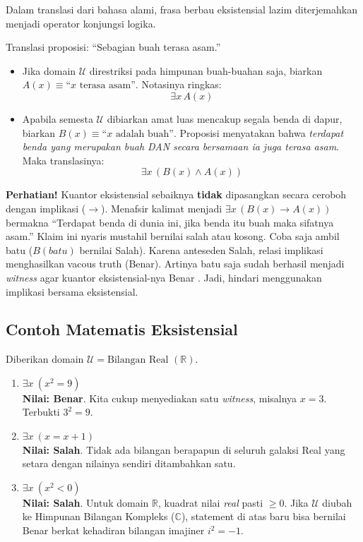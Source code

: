Dalam translasi dari bahasa alami, frasa berbau eksistensial lazim diterjemahkan menjadi operator konjungsi logika.

\begin{contoh}
Translasi proposisi: ``Sebagian buah terasa asam.''
\begin{itemize}
    \item Jika domain $\mathcal{U}$ direstriksi pada himpunan buah-buahan saja, biarkan $A(x) \equiv \text{``}x \text{ terasa asam''}$. Notasinya ringkas:
    \[ \exists x \, A(x) \]
    
    \item Apabila semesta $\mathcal{U}$ dibiarkan amat luas mencakup segala benda di dapur, biarkan $B(x) \equiv \text{``}x \text{ adalah buah''}$. Proposisi menyatakan bahwa \textit{terdapat benda yang merupakan buah DAN secara bersamaan ia juga terasa asam}. Maka translasinya:
    \[ \exists x \, (B(x) \land A(x)) \]
\end{itemize}
\end{contoh}

\begin{catatan}
\textbf{Perhatian!} Kuantor eksistensial sebaiknya \textbf{tidak} dipasangkan secara ceroboh dengan implikasi ($\rightarrow$). Menafsir kalimat menjadi $\exists x \, (B(x) \rightarrow A(x))$ bermakna ``Terdapat benda di dunia ini, jika benda itu buah maka sifatnya asam.'' Klaim ini nyaris mustahil bernilai salah atau kosong. Coba saja ambil batu ($B(\textit{batu})$ bernilai Salah). Karena anteseden Salah, relasi implikasi menghasilkan vacous truth (Benar). Artinya batu saja sudah berhasil menjadi \textit{witness} agar kuantor eksistensial-nya Benar \cite{wiki_quantifier_logic}. Jadi, hindari menggunakan implikasi bersama eksistensial.
\end{catatan}

\subsection{Contoh Matematis Eksistensial}

\begin{contoh}
Diberikan domain $\mathcal{U} = \text{Bilangan Real } (\mathbb{R})$.
\begin{enumerate}
    \item $\exists x \ (x^2 = 9)$ \\ \textbf{Nilai: Benar}. Kita cukup menyediakan satu \textit{witness}, misalnya $x = 3$. Terbukti $3^2 = 9$.
    \item $\exists x \ (x = x + 1)$ \\ \textbf{Nilai: Salah}. Tidak ada bilangan berapapun di seluruh galaksi Real yang setara dengan nilainya sendiri ditambahkan satu.
    \item $\exists x \ (x^2 < 0)$ \\ \textbf{Nilai: Salah}. Untuk domain $\mathbb{R}$, kuadrat nilai \emph{real} pasti $\geq 0$. Jika $\mathcal{U}$ diubah ke Himpunan Bilangan Kompleks ($\mathbb{C}$), statement di atas baru bisa bernilai Benar berkat kehadiran bilangan imajiner $i^2 = -1$.
\end{enumerate}
\end{contoh}
